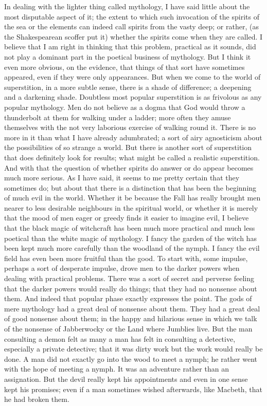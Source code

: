 In dealing with the lighter thing called mythology, I have said little about the most disputable aspect of it; the extent to which such invocation of the spirits of the sea or the elements can indeed call spirits from the vasty deep; or rather, (as the Shakespearean scoffer put it) whether the spirits come when they are called. I believe that I am right in thinking that this problem, practical as it sounds, did not play a dominant part in the poetical business of mythology. But I think it even more obvious, on the evidence, that things of that sort have sometimes appeared, even if they were only appearances. But when we come to the world of superstition, in a more subtle sense, there is a shade of difference; a deepening and a darkening shade. Doubtless most popular superstition is as frivolous as any popular mythology. Men do not believe as a dogma that God would throw a thunderbolt at them for walking under a ladder; more often they amuse themselves with the not very laborious exercise of walking round it. There is no more in it than what I have already adumbrated; a sort of airy agnosticism about the possibilities of so strange a world. But there is another sort of superstition that does definitely look for results; what might be called a realistic superstition. And with that the question of whether spirits do answer or do appear becomes much more serious. As I have said, it seems to me pretty certain that they sometimes do; but about that there is a distinction that has been the beginning of much evil in the world. Whether it be because the Fall has really brought men nearer to less desirable neighbours in the spiritual world, or whether it is merely that the mood of men eager or greedy finds it easier to imagine evil, I believe that the black magic of witchcraft has been much more practical and much less poetical than the white magic of mythology. I fancy the garden of the witch has been kept much more carefully than the woodland of the nymph. I fancy the evil field has even been more fruitful than the good. To start with, some impulse, perhaps a sort of desperate impulse, drove men to the darker powers when dealing with practical problems. There was a sort of secret and perverse feeling that the darker powers would really do things; that they had no nonsense about them. And indeed that popular phase exactly expresses the point. The gods of mere mythology had a great deal of nonsense about them. They had a great deal of good nonsense about them; in the happy and hilarious sense in which we talk of the nonsense of Jabberwocky or the Land where Jumblies live. But the man consulting a demon felt as many a man has felt in consulting a detective, especially a private detective; that it was dirty work but the work would really be done. A man did not exactly go into the wood to meet a nymph; he rather went with the hope of meeting a nymph. It was an adventure rather than an assignation. But the devil really kept his appointments and even in one sense kept his promises; even if a man sometimes wished afterwards, like Macbeth, that he had broken them.

